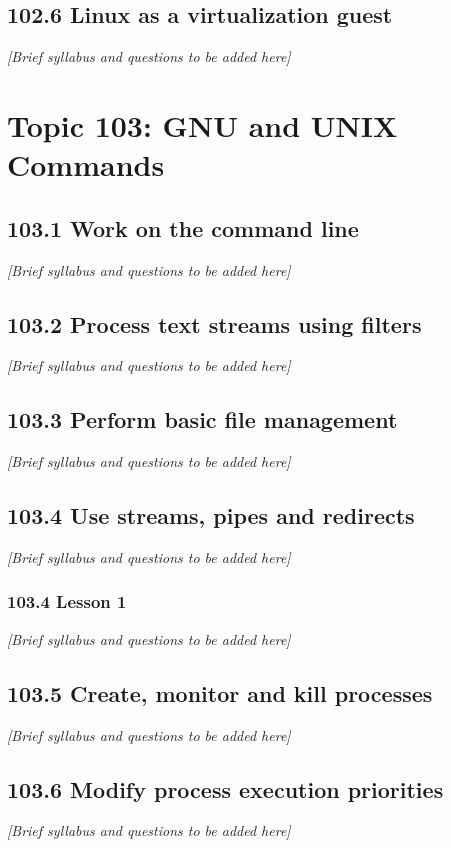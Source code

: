 \documentclass[12pt,a4paper]{report}
\begin{document}
\section{102.6 Linux as a virtualization guest}
\textit{[Brief syllabus and questions to be added here]}

\chapter{Topic 103: GNU and UNIX Commands}
\section{103.1 Work on the command line}
\textit{[Brief syllabus and questions to be added here]}

\section{103.2 Process text streams using filters}
\textit{[Brief syllabus and questions to be added here]}

\section{103.3 Perform basic file management}
\textit{[Brief syllabus and questions to be added here]}

\section{103.4 Use streams, pipes and redirects}
\textit{[Brief syllabus and questions to be added here]}

\subsection*{103.4 Lesson 1}
\textit{[Brief syllabus and questions to be added here]}

\section{103.5 Create, monitor and kill processes}
\textit{[Brief syllabus and questions to be added here]}

\section{103.6 Modify process execution priorities}
\textit{[Brief syllabus and questions to be added here]}
\end{document}
